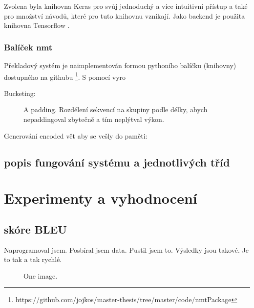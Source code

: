 Zvolena byla knihovna Keras \cite{keras} pro svůj jednoduchý a více intuitivní přístup a také pro množství návodů, které pro tuto knihovnu vznikají. Jako backend je použita knihovna Tensorflow \cite{tensorflow}.

\subsection{Balíček nmt}
Překladový systém je naimplementován formou pythoního balíčku (knihovny) dostupného na githubu \footnote{https://github.com/jojkos/master-thesis/tree/master/code/nmtPackage}. S pomocí vyro

\begin{description}
  \item[Bucketing:] A padding. Rozdělení sekvencí na skupiny podle délky, abych nepaddingoval zbytečně a tím neplýtval výkon. 
  \item[Generování encoded vět aby se vešly do paměti:]
\end{description}


\section{popis fungování systému a jednotlivých tříd}

\chapter{Experimenty a vyhodnocení} \label{chapter:results}
\section{skóre BLEU}


Naprogramoval jsem.
Posbíral jsem data.
Pustil jsem to.
Výsledky jsou takové.
Je to tak a tak rychlé.


\begin{figure}[h]
    \begin{center}
    \end{center}
	\caption{One image. }
	\label{img:TODO}
\end{figure}




